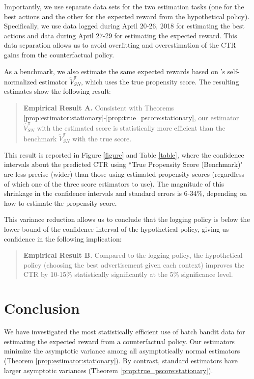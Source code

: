 \documentclass[letterpaper]{article} \usepackage{aaai19}  \usepackage{times}  \usepackage{helvet}  \usepackage{courier}  \usepackage{url}  \usepackage{graphicx}  \frenchspacing  \usepackage{comment}
\newcommand{\citet}[1]
{\citeauthor{#1} \shortcite{#1}}
\begin{document}
Importantly, we use separate data sets for the two estimation tasks (one for the best actions and the other for the expected reward from the hypothetical policy). 
Specifically, we use data logged during April 20-26, 2018 for estimating the best actions and data during April 27-29 for estimating the expected reward. 
This data separation allows us to avoid overfitting and overestimation of the CTR gains from the counterfactual policy. 

As a benchmark, we also estimate the same expected rewards based on \citet{Swaminathan2015b}'s self-normalized estimator $\tilde V^\pi_{SN}$, which uses the true propensity score. 
The resulting estimates show the following result: 

\begin{quote}
	\textbf{Empirical Result A.} Consistent with Theorems \ref{prop:estimator:stationary}-\ref{prop:true_pscore:stationary}, our estimator $\hat V^{\pi}_{SN}$ with the estimated score is statistically more efficient than the benchmark $\tilde V^\pi_{SN}$ with the true score. 
\end{quote}

This result is reported in Figure \ref{figure} and Table \ref{table}, where the confidence intervals about the predicted CTR using ``True Propensity Score (Benchmark)" are less precise (wider) than those using estimated propensity scores (regardless of which one of the three score estimators to use). 
The magnitude of this shrinkage in the confidence intervals and standard errors is 6-34\%, depending on how to estimate the propensity score. 

This variance reduction allows us to conclude that the logging policy is below the lower bound of the confidence interval of the hypothetical policy, giving us confidence in the following implication: 

\begin{quote}
	\textbf{Empirical Result B.} Compared to the logging policy, the hypothetical policy (choosing the best advertisement given each context) improves the CTR by 10-15\% statistically significantly at the 5\% significance level. 
\end{quote}

\section{Conclusion} 

We have investigated the most statistically efficient use of batch bandit data for estimating the expected reward from a counterfactual policy. 
Our estimators minimize the asymptotic variance among all asymptotically normal estimators (Theorem \ref{prop:estimator:stationary}). 
By contrast, standard estimators have larger asymptotic variances (Theorem \ref{prop:true_pscore:stationary}). 
\end{document}
